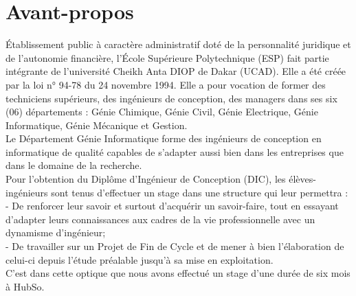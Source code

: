 %
%
%
%
%
%
\chapter*{Avant-propos}
\begin{SingleSpace}

Établissement public à caractère administratif doté de la personnalité juridique et de l’autonomie financière, l’École Supérieure Polytechnique (ESP) fait partie intégrante de l’université Cheikh Anta DIOP de Dakar (UCAD). Elle a été créée par la loi n° 94-78 du 24 novembre 1994. Elle a pour vocation de former des techniciens supérieurs, des ingénieurs de conception, des managers dans ses six (06) départements : Génie Chimique, Génie Civil, Génie Electrique, Génie Informatique, Génie Mécanique et Gestion.\\
Le Département Génie Informatique forme des ingénieurs de conception en informatique de qualité capables de s’adapter aussi bien dans les entreprises que dans le domaine de la recherche.\\
Pour l’obtention du Diplôme d’Ingénieur de Conception (DIC), les élèves-ingénieurs sont tenus d’effectuer un stage dans une structure qui leur permettra : \\
- De renforcer leur savoir et surtout d’acquérir un savoir-faire, tout en essayant d’adapter leurs connaissances aux cadres de la vie professionnelle avec un dynamisme d’ingénieur;\\
- De travailler sur un Projet de Fin de Cycle et de mener à bien l’élaboration de celui-ci depuis l’étude préalable jusqu'à sa mise en exploitation.\\
C’est dans cette optique que nous avons effectué un stage d'une durée de six mois à HubSo.

\end{SingleSpace}
